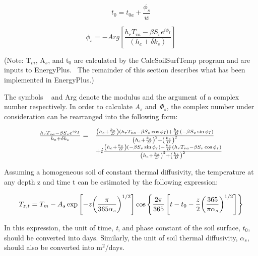 \begin{equation}
{t_0} = {t_{0a}} + \frac{{{\phi_s}}}{w}
\end{equation}

\begin{equation}
{\phi_s} =  - Arg\left[ {\frac{{{h_r}{T_{va}} - \beta {S_v}{e^{i{\phi_I}}}}}{{\left( {{h_e} + \delta {k_s}} \right)}}} \right]
\end{equation}

(Note: T\(_{m}\), A\(_{s}\), and t\(_{0}\) are calculated by the CalcSoilSurfTemp program and are inputs to EnergyPlus.~ The remainder of this section describes what has been implemented in EnergyPlus.)

The symbols \textbar{}\textbar{}~ \textbar{}\textbar{} and Arg denote the modulus and the argument of a complex number respectively. In order to calculate \emph{A\(_{s}\)} and \emph{Φ\(_{s}\)}, the complex number under consideration can be rearranged into the following form:

\begin{equation}
  \begin{array}{rl}
    \frac{h_r T_{va} - \beta S_v e^{i \phi_I}}{h_e + \delta k_s}
           =&  \frac{ \PB{h_e + \frac{k_s}{D}} \PB{ h_r T_{va} - \beta S_v \cos \phi_I} + \frac{k_s}{D} \PB{-\beta S_v \sin \phi_I}}{\PB{h_e + \frac{k_s}{D}}^2 + \PB{\frac{k_s}{D}}^2} \\
           &+ i\frac{ \PB{h_e + \frac{k_s}{D}} \PB{-\beta S_v \sin \phi_I} - \frac{k_s}{D} \PB{h_r T_{va} - \beta S_v \cos \phi_I}}{\PB{h_e + \frac{k_s}{D}}^2 + \PB{\frac{k_s}{D}}^2}
  \end{array}
\end{equation}

Assuming a homogeneous soil of constant thermal diffusivity, the temperature at any depth z and time t can be estimated by the following expression:

\begin{equation}
{T_{z,t}} = {T_m} - {A_s}\exp \left[ { - z{{\left( {\frac{\pi }{{{\rm{365}}{\alpha_s}}}} \right)}^{1/2}}} \right]\cos \left\{ {\frac{{2\pi }}{{{\rm{365}}}}\left[ {t - {t_0} - \frac{z}{2}{{\left( {\frac{{{\rm{365}}}}{{\pi {\alpha_s}}}} \right)}^{1/2}}} \right]} \right\}
\end{equation}

In this expression, the unit of time, \emph{t}, and phase constant of the soil surface, \(t_{0}\), should be converted into days. Similarly, the unit of soil thermal diffusivity, \({\alpha_{s}}\), should also be converted into m\(^{2}\)/days.

